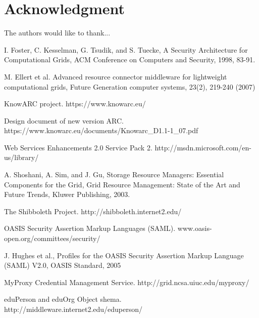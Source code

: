 \documentclass[conference]{IEEEtran}
\begin{document}
\section*{Acknowledgment}


The authors would like to thank...





%

\begin{thebibliography}{99}

I. Foster, C. Kesselman, G. Tsudik, and S. Tuecke, A Security Architecture for 
Computational Grids, ACM Conference on Computers and Security, 1998, 83-91.

M. Ellert et al. Advanced resource connector middleware for lightweight computational 
grids, Future Generation computer systems, 23(2), 219-240 (2007)

KnowARC project.  https://www.knowarc.eu/

Design document of new version ARC. https://www.knowarc.eu/documents/Knowarc\_D1.1-1\_07.pdf

Web Services Enhancements 2.0 Service Pack 2. http://msdn.microsoft.com/en-us/library/

A. Shoshani, A. Sim, and J. Gu, Storage Resource Managers: Essential Components for the Grid, 
Grid Resource Management: State of the Art and Future Trends, Kluwer Publishing, 2003.

The Shibboleth Project. http://shibboleth.internet2.edu/

OASIS Security Assertion Markup Languages (SAML).
www.oasis-open.org/committees/security/

J. Hughes et al., Profiles for the OASIS Security Assertion Markup
Language (SAML) V2.0, OASIS Standard, 2005

MyProxy Credential Management Service. http://grid.ncsa.uiuc.edu/myproxy/

eduPerson and eduOrg Object shema. http://middleware.internet2.edu/eduperson/


\end{thebibliography}
\end{document}
